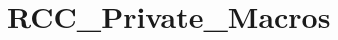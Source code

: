 \hypertarget{group___r_c_c___private___macros}{}\section{R\+C\+C\+\_\+\+Private\+\_\+\+Macros}
\label{group___r_c_c___private___macros}
